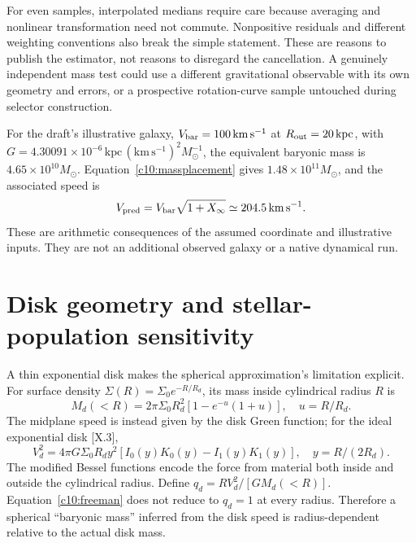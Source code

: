For even samples, interpolated medians require care because averaging and nonlinear transformation need not commute. Nonpositive residuals and different weighting conventions also break the simple statement. These are reasons to publish the estimator, not reasons to disregard the cancellation. A genuinely independent mass test could use a different gravitational observable with its own geometry and errors, or a prospective rotation-curve sample untouched during selector construction.

For the draft's illustrative galaxy, $V_{\rm bar}=100\,\mathrm{km\,s^{-1}}$ at $R_{\rm out}=20\,\mathrm{kpc}$, with $G=4.30091\times10^{-6}\,\mathrm{kpc}\,(\mathrm{km\,s^{-1}})^2M_\odot^{-1}$, the equivalent baryonic mass is $4.65\times10^{10}M_\odot$. Equation~\eqref{c10:massplacement} gives $1.48\times10^{11}M_\odot$, and the associated speed is
\begin{equation}
 V_{\rm pred}=V_{\rm bar}\sqrt{1+X_\infty}
 \simeq204.5\,\mathrm{km\,s^{-1}}.
 \label{c10:example}
\end{equation}
These are arithmetic consequences of the assumed coordinate and illustrative inputs. They are not an additional observed galaxy or a native dynamical run.

\section{Disk geometry and stellar-population sensitivity}

A thin exponential disk makes the spherical approximation's limitation explicit. For surface density $\Sigma(R)=\Sigma_0e^{-R/R_d}$, its mass inside cylindrical radius $R$ is
\begin{equation}
 M_d(<R)=2\pi\Sigma_0R_d^2[1-e^{-u}(1+u)],\quad u=R/R_d.
 \label{c10:diskmass}
\end{equation}
The midplane speed is instead given by the disk Green function; for the ideal exponential disk [X.3],
\begin{equation}
 V_d^2=4\pi G\Sigma_0R_d y^2
 [I_0(y)K_0(y)-I_1(y)K_1(y)],\quad y=R/(2R_d).
 \label{c10:freeman}
\end{equation}
The modified Bessel functions encode the force from material both inside and outside the cylindrical radius. Define $q_d=RV_d^2/[GM_d(<R)]$. Equation~\eqref{c10:freeman} does not reduce to $q_d=1$ at every radius. Therefore a spherical ``baryonic mass'' inferred from the disk speed is radius-dependent relative to the actual disk mass.

